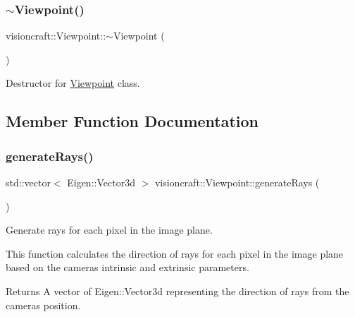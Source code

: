 \subsubsection{\texorpdfstring{$\sim$\+Viewpoint()}{~Viewpoint()}}
{\footnotesize\ttfamily visioncraft\+::\+Viewpoint\+::$\sim$\+Viewpoint (\begin{DoxyParamCaption}{ }\end{DoxyParamCaption})}



Destructor for \hyperlink{classvisioncraft_1_1Viewpoint}{Viewpoint} class. 



\subsection{Member Function Documentation}
\mbox{\label{classvisioncraft_1_1Viewpoint_adeee2e5fa09522d886656848af37ff11}} 
\subsubsection{\texorpdfstring{generate\+Rays()}{generateRays()}}
{\footnotesize\ttfamily std\+::vector$<$ Eigen\+::\+Vector3d $>$ visioncraft\+::\+Viewpoint\+::generate\+Rays (\begin{DoxyParamCaption}{ }\end{DoxyParamCaption})}



Generate rays for each pixel in the image plane. 

This function calculates the direction of rays for each pixel in the image plane based on the camera\textquotesingle{}s intrinsic and extrinsic parameters.

\begin{DoxyReturn}{Returns}
A vector of Eigen\+::\+Vector3d representing the direction of rays from the camera\textquotesingle{}s position. 
\end{DoxyReturn}
\mbox{\label{classvisioncraft_1_1Viewpoint_aa6968c8ab6b7d1ee62dfee8db3a580dc}} 

